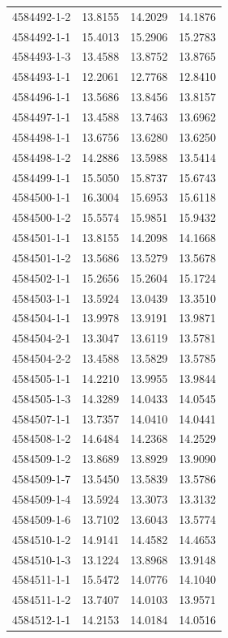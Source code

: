 \begin{longtable}{lrrr}
4584492-1-2 & 13.8155 & 14.2029 & 14.1876 \\
4584492-1-1 & 15.4013 & 15.2906 & 15.2783 \\
4584493-1-3 & 13.4588 & 13.8752 & 13.8765 \\
4584493-1-1 & 12.2061 & 12.7768 & 12.8410 \\
4584496-1-1 & 13.5686 & 13.8456 & 13.8157 \\
4584497-1-1 & 13.4588 & 13.7463 & 13.6962 \\
4584498-1-1 & 13.6756 & 13.6280 & 13.6250 \\
4584498-1-2 & 14.2886 & 13.5988 & 13.5414 \\
4584499-1-1 & 15.5050 & 15.8737 & 15.6743 \\
4584500-1-1 & 16.3004 & 15.6953 & 15.6118 \\
4584500-1-2 & 15.5574 & 15.9851 & 15.9432 \\
4584501-1-1 & 13.8155 & 14.2098 & 14.1668 \\
4584501-1-2 & 13.5686 & 13.5279 & 13.5678 \\
4584502-1-1 & 15.2656 & 15.2604 & 15.1724 \\
4584503-1-1 & 13.5924 & 13.0439 & 13.3510 \\
4584504-1-1 & 13.9978 & 13.9191 & 13.9871 \\
4584504-2-1 & 13.3047 & 13.6119 & 13.5781 \\
4584504-2-2 & 13.4588 & 13.5829 & 13.5785 \\
4584505-1-1 & 14.2210 & 13.9955 & 13.9844 \\
4584505-1-3 & 14.3289 & 14.0433 & 14.0545 \\
4584507-1-1 & 13.7357 & 14.0410 & 14.0441 \\
4584508-1-2 & 14.6484 & 14.2368 & 14.2529 \\
4584509-1-2 & 13.8689 & 13.8929 & 13.9090 \\
4584509-1-7 & 13.5450 & 13.5839 & 13.5786 \\
4584509-1-4 & 13.5924 & 13.3073 & 13.3132 \\
4584509-1-6 & 13.7102 & 13.6043 & 13.5774 \\
4584510-1-2 & 14.9141 & 14.4582 & 14.4653 \\
4584510-1-3 & 13.1224 & 13.8968 & 13.9148 \\
4584511-1-1 & 15.5472 & 14.0776 & 14.1040 \\
4584511-1-2 & 13.7407 & 14.0103 & 13.9571 \\
4584512-1-1 & 14.2153 & 14.0184 & 14.0516 \\

\end{longtable}
